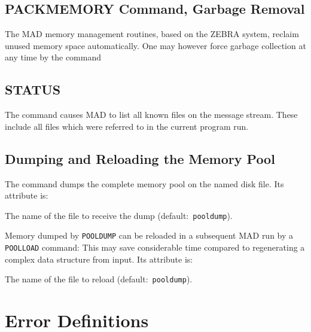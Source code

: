 \section{PACKMEMORY Command, Garbage Removal}
\label{S-PACKMEM}
The MAD memory management routines, based on the ZEBRA system,
reclaim unused memory space automatically.
One may however force garbage collection at any time by the
 command
 
\section{STATUS}
\label{S-STATUS}
The  command
causes MAD to list all known files on the message stream.
These include all files which were referred to in the current
program run.
 
\section{Dumping and Reloading the Memory Pool}
\label{S-POOL}
The  command
dumps the complete memory pool on the named disk file.
Its attribute is:
\begin{mylist}
The name of the file to receive the dump (default:~{\tt pooldump}).
\end{mylist}
Memory dumped by {\tt POOLDUMP} can be reloaded in a subsequent
MAD run by a {\tt POOLLOAD} command:
This may save considerable time compared to regenerating a complex
data structure from input.
Its attribute is:
\begin{mylist}
The name of the file to reload (default:~{\tt pooldump}).
\end{mylist}

\chapter{Error Definitions}
\label{S-ERROR}
 
